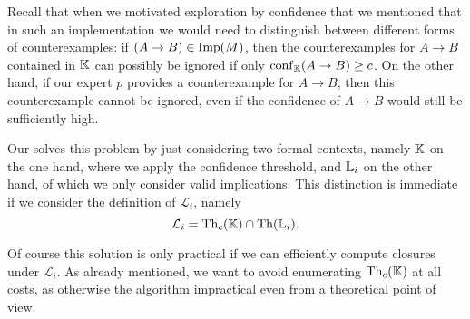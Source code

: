 Recall that when we motivated exploration by confidence that we mentioned that in such an
implementation we would need to distinguish between different forms of counterexamples: if
$(A \to B) \in \operatorname{Imp}(M)$, then the counterexamples for $A \to B$ contained in ${\mathbb{K}}$ can
possibly be ignored if only $\operatorname{conf}_{{\mathbb{K}}}(A \to B) \ge c$.  On the other hand, if our
expert $p$ provides a counterexample for $A \to B$, then this counterexample cannot be
ignored, even if the confidence of $A \to B$ would still be sufficiently high.

Our  solves this problem by just
considering two formal contexts, namely ${\mathbb{K}}$ on the one hand, where we apply the
confidence threshold, and ${\mathbb{L}}_{i}$ on the other hand, of which we only consider valid
implications.  This distinction is immediate if we consider the definition of
$\mathcal{L}_{i}$, namely
\begin{equation*}
  \mathcal{L}_{i} = \operatorname{Th}_{c}({\mathbb{K}}) \cap \operatorname{Th}({\mathbb{L}}_{i}).
\end{equation*}

Of course this solution is only practical if we can efficiently compute closures under
$\mathcal{L}_{i}$.  As already mentioned, we want to avoid enumerating $\operatorname{Th}_{c}({\mathbb{K}})$
at all costs, as otherwise the algorithm impractical even from a theoretical point of
view.

